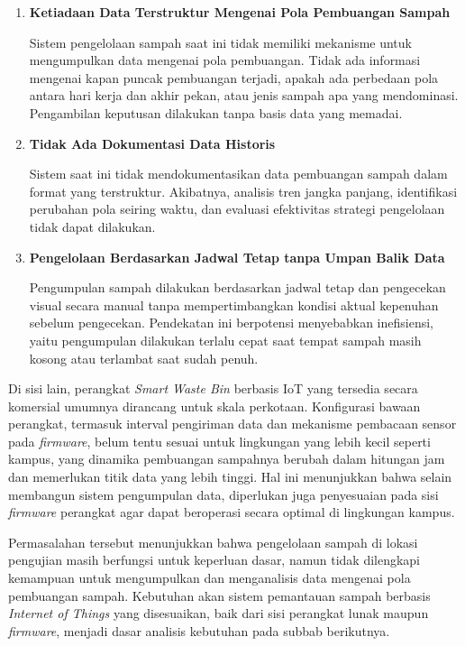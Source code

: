 \begin{enumerate}
    \item \textbf{Ketiadaan Data Terstruktur Mengenai Pola Pembuangan Sampah}

    Sistem pengelolaan sampah saat ini tidak memiliki mekanisme untuk mengumpulkan data mengenai pola pembuangan. Tidak ada informasi mengenai kapan puncak pembuangan terjadi, apakah ada perbedaan pola antara hari kerja dan akhir pekan, atau jenis sampah apa yang mendominasi. Pengambilan keputusan dilakukan tanpa basis data yang memadai.

    \item \textbf{Tidak Ada Dokumentasi Data Historis}

    Sistem saat ini tidak mendokumentasikan data pembuangan sampah dalam format yang terstruktur. Akibatnya, analisis tren jangka panjang, identifikasi perubahan pola seiring waktu, dan evaluasi efektivitas strategi pengelolaan tidak dapat dilakukan.

    \item \textbf{Pengelolaan Berdasarkan Jadwal Tetap tanpa Umpan Balik Data}

    Pengumpulan sampah dilakukan berdasarkan jadwal tetap dan pengecekan visual secara manual tanpa mempertimbangkan kondisi aktual kepenuhan sebelum pengecekan. Pendekatan ini berpotensi menyebabkan inefisiensi, yaitu pengumpulan dilakukan terlalu cepat saat tempat sampah masih kosong atau terlambat saat sudah penuh.
\end{enumerate}

Di sisi lain, perangkat \textit{Smart Waste Bin} berbasis IoT yang tersedia secara komersial umumnya dirancang untuk skala perkotaan. Konfigurasi bawaan perangkat, termasuk interval pengiriman data dan mekanisme pembacaan sensor pada \textit{firmware}, belum tentu sesuai untuk lingkungan yang lebih kecil seperti kampus, yang dinamika pembuangan sampahnya berubah dalam hitungan jam dan memerlukan titik data yang lebih tinggi. Hal ini menunjukkan bahwa selain membangun sistem pengumpulan data, diperlukan juga penyesuaian pada sisi \textit{firmware} perangkat agar dapat beroperasi secara optimal di lingkungan kampus.

Permasalahan tersebut menunjukkan bahwa pengelolaan sampah di lokasi pengujian masih berfungsi untuk keperluan dasar, namun tidak dilengkapi kemampuan untuk mengumpulkan dan menganalisis data mengenai pola pembuangan sampah. Kebutuhan akan sistem pemantauan sampah berbasis \textit{Internet of Things} yang disesuaikan, baik dari sisi perangkat lunak maupun \textit{firmware}, menjadi dasar analisis kebutuhan pada subbab berikutnya.

